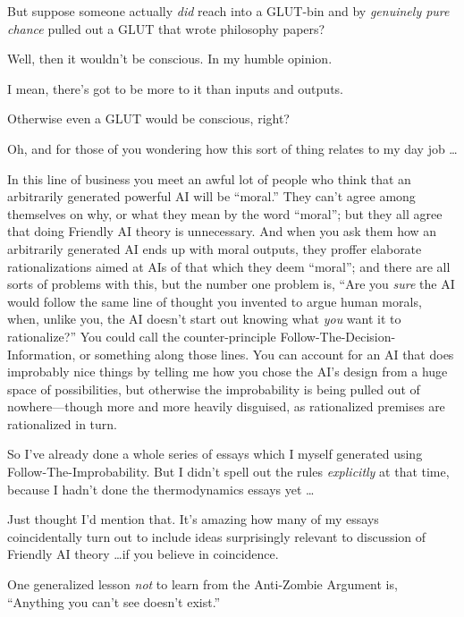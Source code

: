 {
 But suppose someone actually \textit{did} reach into a GLUT-bin
and by \textit{genuinely pure }\textit{chance} pulled out a GLUT that
wrote philosophy papers?}

{
 Well, then it wouldn't be conscious. In my humble
opinion.}

{
 I mean, there's got to be more to it than inputs
and outputs.}

{
 Otherwise even a GLUT would be conscious, right?}

{
 Oh, and for those of you wondering how this sort of thing relates
to my day job \ldots}

{
 In this line of business you meet an awful lot of people who think
that an arbitrarily generated powerful AI will be
``moral.'' They
can't agree among themselves on why, or what they mean
by the word ``moral''; but they all
agree that doing Friendly AI theory is unnecessary. And when you ask
them how an arbitrarily generated AI ends up with moral outputs, they
proffer elaborate rationalizations aimed at AIs of that which they deem
``moral''; and there are all sorts
of problems with this, but the number one problem is,
``Are you \textit{sure} the AI would follow the same
line of thought you invented to argue human morals, when, unlike you,
the AI doesn't start out knowing what \textit{you} want
it to rationalize?'' You could call the
counter-principle Follow-The-Decision-Information, or something along
those lines. You can account for an AI that does improbably nice things
by telling me how you chose the AI's design from a huge
space of possibilities, but otherwise the improbability is being pulled
out of nowhere---though more and more heavily disguised, as
rationalized premises are rationalized in turn.}

{
 So I've already done a whole series of essays
which I myself generated using Follow-The-Improbability. But I
didn't spell out the rules \textit{explicitly} at that
time, because I hadn't done the thermodynamics essays
yet \ldots}

{
 Just thought I'd mention that.
It's amazing how many of my essays coincidentally turn
out to include ideas surprisingly relevant to discussion of Friendly AI
theory \ldots if you believe in coincidence.}

\myendsectiontext


\bigskip


{
 One generalized lesson \textit{not} to learn from the Anti-Zombie
Argument is, ``Anything you can't see
doesn't exist.'' }

